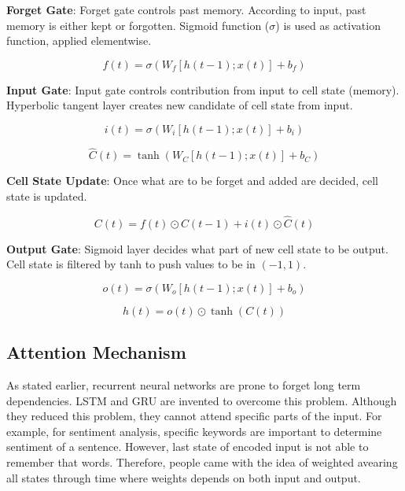 \textbf{Forget Gate}: Forget gate controls past memory. According to input, past memory is either kept or forgotten. Sigmoid function ($\sigma$) is used as activation function, applied elementwise.

\begin{equation}
\label{eqn:lstm_forget}
f(t) = \sigma(W_f [h(t-1); x(t)] + b_f) 
\end{equation}

\textbf{Input Gate}: Input gate controls contribution from input to cell state (memory). Hyperbolic tangent layer creates new candidate of cell state from input.

\begin{equation}
\label{eqn:lstm_inp}
i(t) = \sigma(W_{i} [h(t-1); x(t)] + b_{i}) 
\end{equation}

\begin{equation}
\label{eqn:lstm_cellstcand}
\hat{C}(t) = \tanh(W_{C} [h(t-1); x(t)] + b_{C}) 
\end{equation}

\textbf{Cell State Update}: Once what are to be forget and added are decided, cell state is updated.

\begin{equation}
\label{eqn:lstm_cellstupt}
C(t) = f(t) \odot C(t-1) + i(t) \odot \hat{C}(t)
\end{equation}


\textbf{Output Gate}: Sigmoid layer decides what part of new cell state to be output. Cell state is filtered by tanh to push values to be in $(-1,1)$.

\begin{equation}
\label{eqn:lstm_out}
o(t) = \sigma(W_{o} [h(t-1); x(t)] + b_{o}) 
\end{equation}

\begin{equation}
h(t) = o(t) \odot \tanh(C(t))
\end{equation}

\subsection{Attention Mechanism}
As stated earlier, recurrent neural networks are prone to forget long term dependencies. LSTM and GRU are invented to overcome this problem. Although they reduced this problem, they cannot attend specific parts of the input. For example, for sentiment analysis, specific keywords are important to determine sentiment of a sentence. However, last state of encoded input is not able to remember that words. Therefore, people came with the idea of weighted avearing all states through time where weights depends on both input and output. 

